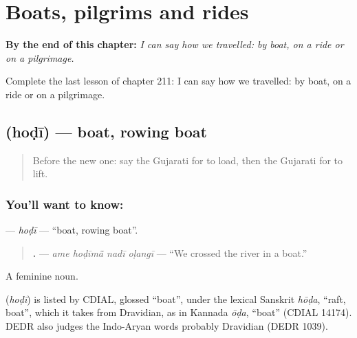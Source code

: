 
\chapter{Boats, pilgrims and rides}
\label{ch:gu-boats-pilgrims-and-rides}

\begin{chapteropening}
\textbf{By the end of this chapter:} \emph{I can say how we travelled: by boat, on a ride or on a pilgrimage.}

Complete the last lesson of chapter 211: I can say how we travelled: by boat, on a ride or on a pilgrimage.
\end{chapteropening}

\section[\texorpdfstring{\gu{હોડી} (hoḍī)}{હોડી (hoḍī)}]{ (hoḍī) — boat, rowing boat}

\label{lesson:GU-C211-hodi}



\begin{quote}
Before the new one: say the Gujarati for to load, then the Gujarati for to lift.
\end{quote}

\subsection*{You'll want to know: }
\textbf{} — \emph{hoḍī} — \textquotedblleft{}boat, rowing boat\textquotedblright{}.

\begin{quote}
\textbf{   .} — \emph{ame hoḍīmā̃ nadī oḷangī} — \textquotedblleft{}We crossed the river in a boat.\textquotedblright{}
\end{quote}

A feminine noun.

\begin{cousinweb}
\textbf{} (\emph{hoḍī}) is listed by CDIAL, glossed \textquotedblleft{}boat\textquotedblright{}, under the lexical Sanskrit \emph{hōḍa}, \textquotedblleft{}raft, boat\textquotedblright{}, which it takes from Dravidian, as in Kannada \emph{ōḍa}, \textquotedblleft{}boat\textquotedblright{} (CDIAL 14174). DEDR also judges the Indo-Aryan words probably Dravidian (DEDR 1039).
\end{cousinweb}

